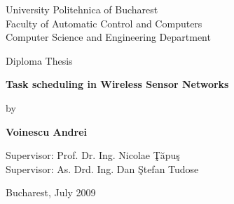 

\pagestyle{empty}
\sffamily

\noindent
\begin{center}
    \Large
    University Politehnica of Bucharest\\
    Faculty of Automatic Control and Computers \\
    Computer Science and Engineering Department \\
\end{center}

\vfill\vfill
\begin{center}
    \Large
    Diploma Thesis\\
\end{center}

\vfill
\begin{center}
	\HUGE\bfseries
	Task scheduling	in Wireless Sensor Networks\\
\vfill
	\large
	
\end{center}

\vfill
\begin{center}
    \Large
    by
\end{center}

\vfill
\begin{center}
    \huge\bfseries
    Voinescu Andrei
\end{center}

\vfill\vfill\vfill
\begin{center}
	\Large
	Supervisor: Prof. Dr. Ing. Nicolae \c{T}\u{a}pu\c{s}\\
	Supervisor: As. Drd. Ing. Dan \c{S}tefan Tudose
\end{center}

\vfill
\begin{center}
\large
    Bucharest, July 2009
\end{center}

\cleardoublepage

\pagestyle{headings}
\tableofcontents


